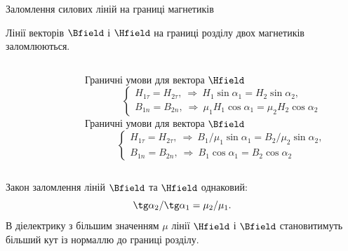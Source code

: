 \documentclass[onlytextwidth]{beamer}
\begin{document}
\begin{frame}{Заломлення силових ліній на границі магнетиків}{}\small
	\begin{block}{}\justifying
		Лінії векторів $\Bfield$ і $\Hfield$ на границі розділу двох
		магнетиків заломлюються.
	\end{block}
	\begin{columns}
		\begin{column}{0.55\linewidth}\centering
            
		\end{column}
		\begin{column}{0.45\linewidth}\scriptsize
			Граничні умови для вектора $\Hfield$
			\begin{equation*}
				\begin{cases}
					H_{1\tau} = H_{2\tau},\ \Rightarrow\ H_1\sin\alpha_1 = H_2\sin\alpha_2, \\
					B_{1n} = B_{2n},\ \Rightarrow\ \mu_1H_1\cos\alpha_1 =
					\mu_2H_2\cos\alpha_2
				\end{cases}
			\end{equation*}
			Граничні умови для вектора $\Bfield$
			\begin{equation*}
				\begin{cases}
					H_{1\tau} = H_{2\tau},\ \Rightarrow\ B_1/\mu_1\sin\alpha_1 =
					B_2/\mu_2\sin\alpha_2, \\
					B_{1n} = B_{2n},\ \Rightarrow\ B_1\cos\alpha_1 =
					B_2\cos\alpha_2
				\end{cases}
			\end{equation*}
		\end{column}
	\end{columns}
	\begin{block}{}\justifying
		Закон заломлення ліній $\Bfield$ та $\Hfield$ однаковий:
		\begin{equation*}
			\tg\alpha_2 / \tg\alpha_1 = \mu_2 / \mu_1.
		\end{equation*}
		В діелектрику з більшим значенням $\mu$ лінії $\Hfield$ і $\Bfield$
		становитимуть більший кут із нормаллю до границі розділу.
	\end{block}
\end{frame}
\end{document}

